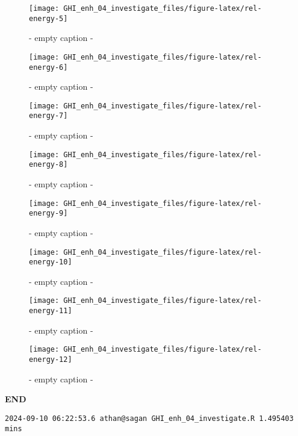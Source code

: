 \documentclass[
  10pt,
  a4paper,oneside]{article}
\begin{document}
\begin{figure}[H]

{\centering \texttt{[image: GHI\_enh\_04\_investigate\_files/figure-latex/rel-energy-5]} 

}

\caption{ - empty caption - }\label{fig:rel-energy-5}
\end{figure}
\begin{figure}[H]

{\centering \texttt{[image: GHI\_enh\_04\_investigate\_files/figure-latex/rel-energy-6]} 

}

\caption{ - empty caption - }\label{fig:rel-energy-6}
\end{figure}
\begin{figure}[H]

{\centering \texttt{[image: GHI\_enh\_04\_investigate\_files/figure-latex/rel-energy-7]} 

}

\caption{ - empty caption - }\label{fig:rel-energy-7}
\end{figure}
\begin{figure}[H]

{\centering \texttt{[image: GHI\_enh\_04\_investigate\_files/figure-latex/rel-energy-8]} 

}

\caption{ - empty caption - }\label{fig:rel-energy-8}
\end{figure}
\begin{figure}[H]

{\centering \texttt{[image: GHI\_enh\_04\_investigate\_files/figure-latex/rel-energy-9]} 

}

\caption{ - empty caption - }\label{fig:rel-energy-9}
\end{figure}
\begin{figure}[H]

{\centering \texttt{[image: GHI\_enh\_04\_investigate\_files/figure-latex/rel-energy-10]} 

}

\caption{ - empty caption - }\label{fig:rel-energy-10}
\end{figure}
\begin{figure}[H]

{\centering \texttt{[image: GHI\_enh\_04\_investigate\_files/figure-latex/rel-energy-11]} 

}

\caption{ - empty caption - }\label{fig:rel-energy-11}
\end{figure}
\begin{figure}[H]

{\centering \texttt{[image: GHI\_enh\_04\_investigate\_files/figure-latex/rel-energy-12]} 

}

\caption{ - empty caption - }\label{fig:rel-energy-12}
\end{figure}

\textbf{END}

\begin{verbatim}
2024-09-10 06:22:53.6 athan@sagan GHI_enh_04_investigate.R 1.495403 mins
\end{verbatim}
\end{document}
